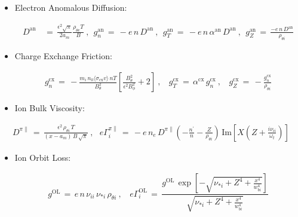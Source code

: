 \documentclass[a4paper,8pt]{article}
\providecommand{\tightlist}{%
  \setlength{\itemsep}{0pt}\setlength{\parskip}{0pt}}
\begin{document}
\begin{itemize}
\item
  Electron Anomalous Diffusion: \small

  \begin{align}
  D^\text{an} \,&=\, \frac{\epsilon^2 \sqrt{\pi}}{2 a_m}
      \frac{\rho_{\theta e} T}{B}~,~~
      g_n^\text{an} \,=\, -e \,n\, D^\text{an}~,~~
      g_T^\text{an} \,=\, -e \,n\, \alpha^\text{an}\, D^\text{an}~,~~
      g_Z^\text{an} \,=\, \frac{-e \,n\, D^\text{an}}{\rho_{\theta i}}
  \end{align}

  \normalsize
\item
  Charge Exchange Friction: \small

  \begin{align}
  g_n^\text{cx} \,=\,
      -\frac{m_i \,n_0 \langle\sigma_\text{cx} v\rangle \,n T}{B_\theta^2}
      \left[\frac{B_\theta^2}{\epsilon^2 B_\phi^2} + 2\right]~,~~~~
      g_T^\text{cx} \,=\, \alpha^\text{cx}\,g_n^\text{cx}~,~~~~
      g_Z^\text{cx} \,=\, -\frac{g_n^\text{cx}}{\rho_{\theta i}}
  \end{align}

  \normalsize
\item
  Ion Bulk Viscosity: 
\end{itemize}

\small

\begin{align}
    D^{\pi\parallel} \,=\, \frac{\epsilon^2 \, \rho_{\theta i} \, T}
        {(x - a_m) \, B \, \sqrt{\pi}}~,~~~
    e \Gamma_i^{\pi\parallel} \,=\, -e\,n_e\,D^{\pi\parallel}
        \left(-\frac{n^\prime}{n} - \frac{Z}{\rho_{\theta i}}\right) \,
        \text{Im}\left[X\left(Z + \frac{i \nu_{ii}}{\omega_t}\right)\right]
\end{align}

\normalsize

\begin{itemize}
\tightlist
\item
  Ion Orbit Loss: \small

  \begin{align}
  g^\text{OL} \,=\, e \,n\, \nu_{ii} \, \nu_{*i} \, \rho_{\theta i}~,~~~~
  e\Gamma_i^\text{OL} \,=\, \dfrac{g^\text{OL}\,
      \exp\left[-\sqrt{\nu_{*i} + Z^4 + \frac{x^4}{w_{bi}^4}}\right]}
      {\sqrt{\nu_{*i} + Z^4 + \frac{x^4}{w_{bi}^4}}}
  \end{align}

  \normalsize
\end{itemize}
\end{document}
